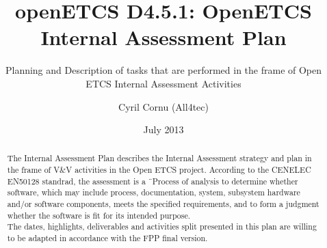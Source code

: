 \documentclass{template/openetcs_article}
\begin{document}
\frontmatter
{}




\title{openETCS D4.5.1: OpenETCS Internal Assessment Plan}

\subtitle{Planning and Description of tasks that are performed in the frame of Open ETCS Internal Assessment Activities}

\date{July 2013}

\author{Cyril Cornu (All4tec)}






\begin{abstract}
The Internal Assessment Plan describes the Internal Assessment strategy and plan in the frame of V\&V activities in the Open ETCS project.
According to the CENELEC EN50128 standrad, the assessment is a \"\ Process of analysis to determine whether software, which may include process, documentation, system, subsystem hardware and/or software components, meets the specified requirements, and to form a judgment whether the software is fit for its intended purpose.\"
\\
The dates, highlights, deliverables and activities split presented in this plan are willing to be adapted in accordance with the FPP final version.
\end{abstract}

\maketitle
\setcounter{tocdepth}{2}
\tableofcontents
\newpage
\end{document}
